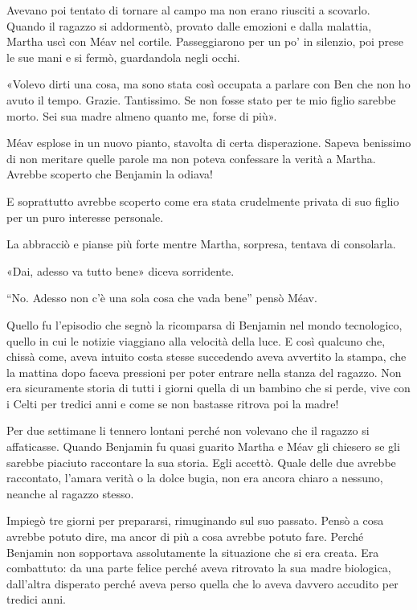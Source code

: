 \documentclass[a4paper,10pt]{memoir}
\begin{document}
Avevano poi tentato di tornare al campo ma non erano riusciti a scovarlo. Quando il ragazzo si addormentò, provato dalle
emozioni e dalla malattia, Martha uscì con Méav nel cortile. Passeggiarono per un po’ in silenzio, poi prese le sue mani
e si fermò, guardandola negli occhi.

«Volevo dirti una cosa, ma sono stata così occupata a parlare con Ben che non ho avuto il tempo. Grazie. Tantissimo. Se
non fosse stato per te mio figlio sarebbe morto. Sei sua madre almeno quanto me, forse di più».

Méav esplose in un nuovo pianto, stavolta di certa disperazione. Sapeva benissimo di non meritare quelle parole ma non
poteva confessare la verità a Martha. Avrebbe scoperto che Benjamin la odiava!

E soprattutto avrebbe scoperto come era stata crudelmente privata di suo figlio per un puro interesse personale.

La abbracciò e pianse più forte mentre Martha, sorpresa, tentava di consolarla.

«Dai, adesso va tutto bene» diceva sorridente.

``No. Adesso non c’è una sola cosa che vada bene'' pensò Méav.

Quello fu l’episodio che segnò la ricomparsa di Benjamin nel mondo tecnologico, quello in cui le notizie viaggiano alla
velocità della luce. E così qualcuno che, chissà come, aveva intuito costa stesse succedendo aveva avvertito la stampa,
che la mattina dopo faceva pressioni per poter entrare nella stanza del ragazzo. Non era sicuramente storia di tutti i
giorni quella di un bambino che si perde, vive con i Celti per tredici anni e come se non bastasse ritrova poi la madre!

Per due settimane li tennero lontani perché non volevano che il ragazzo si affaticasse. Quando Benjamin fu quasi guarito
Martha e Méav gli chiesero se gli sarebbe piaciuto raccontare la sua storia. Egli accettò. Quale delle due avrebbe
raccontato, l’amara verità o la dolce bugia, non era ancora chiaro a nessuno, neanche al ragazzo stesso.

Impiegò tre giorni per prepararsi, rimuginando sul suo passato. Pensò a cosa avrebbe potuto dire, ma ancor di più a cosa
avrebbe potuto fare. Perché Benjamin non sopportava assolutamente la situazione che si era creata. Era combattuto: da
una parte felice perché aveva ritrovato la sua madre biologica, dall’altra disperato perché aveva perso quella che lo
aveva davvero accudito per tredici anni.
\end{document}

